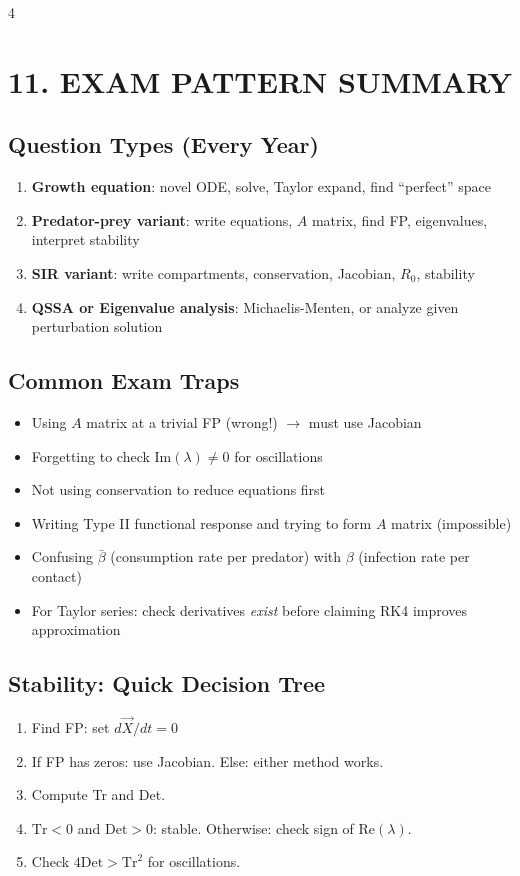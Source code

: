 \documentclass[8pt,landscape]{article}
\begin{document}
\begin{multicols}{4}
\section{11. EXAM PATTERN SUMMARY}

\subsection{Question Types (Every Year)}
\begin{enumerate}
  \item \textbf{Growth equation}: novel ODE, solve, Taylor expand, find ``perfect'' space
  \item \textbf{Predator-prey variant}: write equations, $A$ matrix, find FP, eigenvalues, interpret stability
  \item \textbf{SIR variant}: write compartments, conservation, Jacobian, $R_0$, stability
  \item \textbf{QSSA or Eigenvalue analysis}: Michaelis-Menten, or analyze given perturbation solution
\end{enumerate}

\subsection{Common Exam Traps}
\begin{itemize}
  \item Using $A$ matrix at a trivial FP (wrong!) $\to$ must use Jacobian
  \item Forgetting to check $\text{Im}(\lambda) \neq 0$ for oscillations
  \item Not using conservation to reduce equations first
  \item Writing Type II functional response and trying to form $A$ matrix (impossible)
  \item Confusing $\bar{\beta}$ (consumption rate per predator) with $\beta$ (infection rate per contact)
  \item For Taylor series: check derivatives \emph{exist} before claiming RK4 improves approximation
\end{itemize}

\subsection{Stability: Quick Decision Tree}
\begin{enumerate}
  \item Find FP: set $d\vec{X}/dt = 0$
  \item If FP has zeros: use Jacobian. Else: either method works.
  \item Compute Tr and Det.
  \item $\text{Tr} < 0$ and $\text{Det} > 0$: stable. Otherwise: check sign of $\text{Re}(\lambda)$.
  \item Check $4\text{Det} > \text{Tr}^2$ for oscillations.
\end{enumerate}


\end{multicols}
\end{document}
